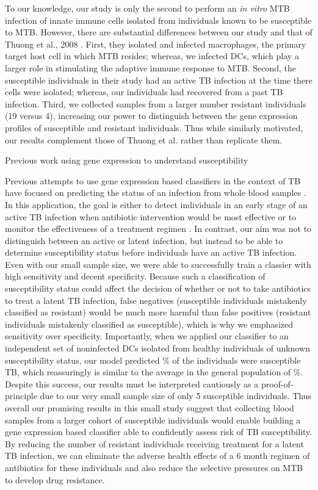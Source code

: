 \documentclass[fleqn,10pt]{wlscirep}
\begin{document}
To our knowledge, our study is only the second to perform an \emph{in
vitro} MTB infection of innate immune cells isolated from individuals
known to be susceptible to MTB. However, there are substantial
differences between our study and that of Thuong et al., 2008
\cite{Thuong2008}. First, they isolated and infected macrophages, the
primary target host cell in which MTB resides; whereas, we infected
DCs, which play a larger role in stimulating the adaptive immune
response to MTB. Second, the susceptible individuals in their study
had an active TB infection at the time there cells were isolated;
whereas, our individuals had recovered from a past TB infection.
Third, we collected samples from a larger number resistant individuals
(19 versus 4), increasing our power to distinguish between the gene
expression profiles of susceptible and resistant individuals. Thus
while similarly motivated, our results complement those of Thuong et
al. rather than replicate them.

Previous work using gene expression to understand susceptibility
\cite{Bryant2014}

Previous attempts to use gene expression based classifiers in the
context of TB have focused on predicting the status of an infection
from whole blood samples \cite{Berry2010, OGarra2013, Blankley2014}.
In this application, the goal is either to detect individuals in an
early stage of an active TB infection when antibiotic intervention
would be most effective or to monitor the effectiveness of a treatment
regimen \cite{Maertzdorf2015}. In contrast, our aim was not to
distinguish between an active or latent infection, but instead to be
able to determine susceptibility status before individuals have an
active TB infection. Even with our small sample size, we were able to
successfully train a classier with high sensitivity and decent
specificity. Because such a classification of susceptibility status
could affect the decision of whether or not to take antibiotics to
treat a latent TB infection, false negatives (susceptible individuals
mistakenly classified as resistant) would be much more harmful than
false positives (resistant individuals mistakenly classified as
susceptible), which is why we emphasized sensitivity over specificity.
Importantly, when we applied our classifier to an independent set of
noninfected DCs isolated from healthy individuals of unknown
susceptibility status, our model predicted \% of the
individuals were susceptible TB, which reassuringly is similar to the
average in the general population of \%. Despite this
success, our results must be interpreted cautiously as a
proof-of-principle due to our very small sample size of only 5
susceptible individuals. Thus overall our promising results in this
small study suggest that collecting blood samples from a larger cohort
of susceptible individuals would enable building a gene expression
based classifier able to confidently assess risk of TB susceptibility.
By reducing the number of resistant individuals receiving treatment
for a latent TB infection, we can eliminate the adverse health effects
of a 6 month regimen of antibiotics for these individuals and also
reduce the selective pressures on MTB to develop drug resistance.
\end{document}
